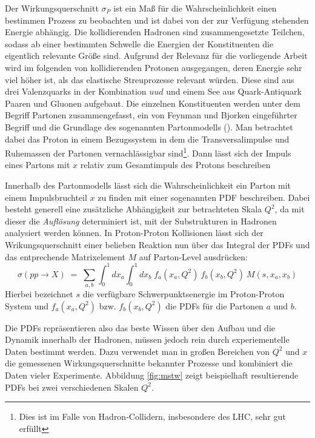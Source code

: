 Der Wirkungsquerschnitt $\sigma_P$ ist ein Maß für die Wahrscheinlichkeit einen
bestimmen Prozess zu beobachten und ist dabei von der zur Verfügung stehenden
Energie abhängig. Die kollidierenden Hadronen sind zusammengesetzte Teilchen,
sodass ab einer bestimmten Schwelle die Energien der Konstituenten die
eigentlich relevante Größe sind. Aufgrund der Relevanz für die vorliegende
Arbeit wird im folgenden von kollidierenden Protonen ausgegangen, deren Energie
sehr viel höher ist, als das elastische Streuprozesse relevant würden. Diese
sind aus drei Valenzquarks in der Kombination $uud$ und einem See aus
Quark-Antiquark Paaren und Gluonen aufgebaut. Die einzelnen Konstituenten
werden unter dem Begriff Partonen zusammengefasst, ein von Feynman und Bjorken
eingeführter Begriff und die Grundlage des sogenannten Partonmodells
(\cite{Bjorken:1968dy}). Man betrachtet dabei das Proton in einem Bezugssystem
in dem die Transversalimpulse und Ruhemassen der Partonen vernachlässigbar
sind\footnote{Dies ist im Falle von Hadron-Collidern, insbesondere des
\ac{LHC}, sehr gut erfüllt}. Dann lässt sich der Impuls eines Partons mit $x$
relativ zum Gesamtimpuls des Protons beschreiben

Innerhalb des Partonmodells lässt sich die Wahrscheinlichkeit ein Parton mit
einem Impulsbruchteil $x$ zu finden mit einer sogenannten \ac{PDF} beschreiben.
Dabei besteht generell eine zusätzliche Abhängigkeit zur betrachteten Skala
$Q^2$, da mit dieser die \textit{Auflösung} determiniert ist, mit der
Substrukturen in Hadronen analysiert werden können. In Proton-Proton
Kollisionen lässt sich der Wrikungsquerschnitt einer belieben Reaktion nun über
das Integral der \ac{PDF}s und das entprechende Matrixelement $M$ auf
Parton-Level ausdrücken:
\begin{equation}
    \sigma(pp\rightarrow X) \;=\; \sum_{a,b} \int_0^1 dx_a \int_0^1 dx_b \;
        f_a(x_a,Q^2) \: f_b(x_b,Q^2) \: M(s,x_a,x_b)
\end{equation}
Hierbei bezeichnet $s$ die verfügbare Schwerpunktsenergie im Proton-Proton
System und $f_a(x_a,Q^2)$ bzw. $f_b(x_b,Q^2)$ die \ac{PDF}s für die Partonen
$a$ und $b$.

Die \ac{PDF}s repräsentieren also das beste Wissen über den Aufbau und die
Dynamik innerhalb der Hadronen, müssen jedoch rein durch experiementelle Daten
bestimmt werden. Dazu verwendet man in großen Bereichen von $Q^2$ und $x$ die
gemessenen Wirkungsquerschnitte bekannter Prozesse und kombiniert die Daten
vieler Experimente. Abbildung \ref{fig:mstw} zeigt beispielhaft resultierende
\ac{PDF}s bei zwei verschiedenen Skalen $Q^2$.

